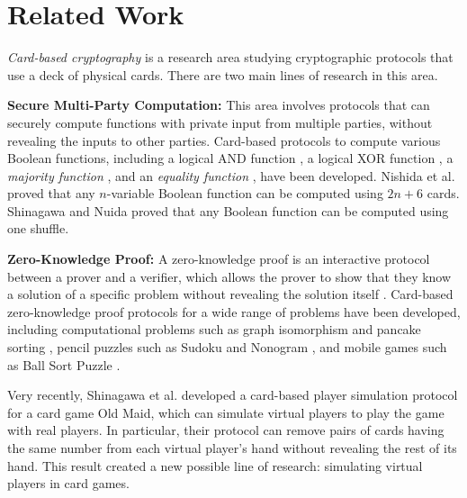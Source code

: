 \section{Related Work}
\textit{Card-based cryptography} is a research area studying cryptographic protocols that use a deck of physical cards. There are two main lines of research in this area.

\textbf{Secure Multi-Party Computation:} This area involves protocols that can securely compute functions with private input from multiple parties, without revealing the inputs to other parties. Card-based protocols to compute various Boolean functions, including a logical AND function \cite{mizuki09}, a logical XOR function \cite{mizuki09}, a \textit{majority function} \cite{nishida13,toyoda}, and an \textit{equality function} \cite{ruangwises21}, have been developed. Nishida et al. \cite{nishida15} proved that any $n$-variable Boolean function can be computed using $2n+6$ cards. Shinagawa and Nuida \cite{garbled} proved that any Boolean function can be computed using one shuffle. 

\textbf{Zero-Knowledge Proof:} A zero-knowledge proof is an interactive protocol between a prover and a verifier, which allows the prover to show that they know a solution of a specific problem without revealing the solution itself \cite{zkp}. Card-based zero-knowledge proof protocols for a wide range of problems have been developed, including computational problems such as graph isomorphism \cite{graph} and pancake sorting \cite{pancake}, pencil puzzles such as Sudoku \cite{sudoku,tanaka} and Nonogram \cite{nonogram}, and mobile games such as Ball Sort Puzzle \cite{ball}.

Very recently, Shinagawa et al. \cite{oldmaid} developed a card-based player simulation protocol for a card game Old Maid, which can simulate virtual players to play the game with real players. In particular, their protocol can remove pairs of cards having the same number from each virtual player's hand without revealing the rest of its hand. This result created a new possible line of research: simulating virtual players in card games.